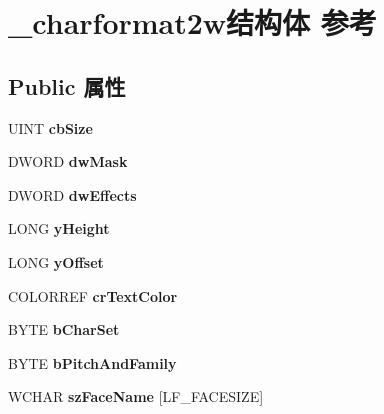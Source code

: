 \hypertarget{struct__charformat2w}{}\section{\+\_\+charformat2w结构体 参考}
\label{struct__charformat2w}
\subsection*{Public 属性}
\begin{DoxyCompactItemize}
\item 
\mbox{\label{struct__charformat2w_a59ed505993529240477b4fbab8e11c56}} 
U\+I\+NT {\bfseries cb\+Size}
\item 
\mbox{\label{struct__charformat2w_a1a369c7f347c1150b7080567d51a0b89}} 
D\+W\+O\+RD {\bfseries dw\+Mask}
\item 
\mbox{\label{struct__charformat2w_a7eba375a9abbeea9a4abbf8e52d7fc1c}} 
D\+W\+O\+RD {\bfseries dw\+Effects}
\item 
\mbox{\label{struct__charformat2w_aa1861bde620f006d7df47a2fa97657c6}} 
L\+O\+NG {\bfseries y\+Height}
\item 
\mbox{\label{struct__charformat2w_a6f990736a7a829f1bd5c474382e7cacd}} 
L\+O\+NG {\bfseries y\+Offset}
\item 
\mbox{\label{struct__charformat2w_acf5f8fd0f2efb079e13001cd3785a969}} 
C\+O\+L\+O\+R\+R\+EF {\bfseries cr\+Text\+Color}
\item 
\mbox{\label{struct__charformat2w_a0dafd6515fdb8b4aa516c1af9b54f28f}} 
B\+Y\+TE {\bfseries b\+Char\+Set}
\item 
\mbox{\label{struct__charformat2w_afba0ab18fa1804b3a228c4de8a242566}} 
B\+Y\+TE {\bfseries b\+Pitch\+And\+Family}
\item 
\mbox{\label{struct__charformat2w_a2437d39ce330be710473bac218512b77}} 
W\+C\+H\+AR {\bfseries sz\+Face\+Name} \mbox{[}L\+F\+\_\+\+F\+A\+C\+E\+S\+I\+ZE\mbox{]}

\end{DoxyCompactItemize}
